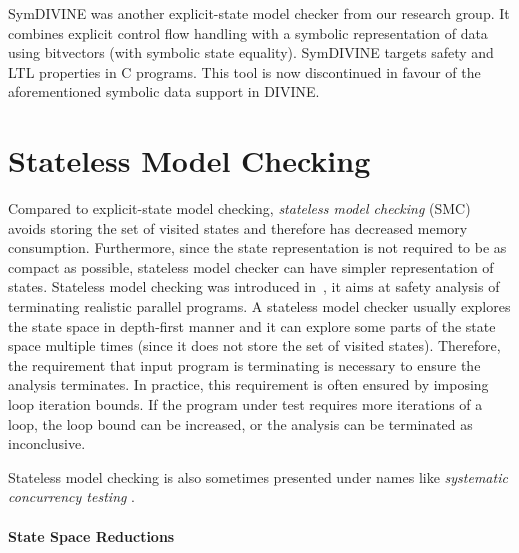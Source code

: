 SymDIVINE  was another explicit-state model checker from our research group.
It combines explicit control flow handling with a symbolic representation of data
using bitvectors (with symbolic state equality).
SymDIVINE targets safety and LTL properties in C programs.
This tool is now discontinued in favour of the aforementioned symbolic data support
in DIVINE.


\section{Stateless Model Checking}\label{sec:stateoftheart:smc}

Compared to explicit-state model checking, \emph{stateless model checking}
(SMC) avoids storing the set of visited states and therefore has decreased
memory consumption.
Furthermore, since the state representation is not required to be as compact as
possible, stateless model checker can have simpler representation of states.
Stateless model checking was introduced in~, it aims at
safety analysis of terminating realistic parallel programs.
A stateless model checker usually explores the state space in depth-first
manner and it can explore some parts of the state space multiple times (since
it does not store the set of visited states).
Therefore, the requirement that input program is terminating is necessary to
ensure the analysis terminates.
In practice, this requirement is often ensured by imposing loop iteration
bounds.
If the program under test requires more iterations of a loop, the loop bound
can be increased, or the analysis can be terminated as inconclusive.

Stateless model checking is also sometimes presented under names like \emph{systematic concurrency testing} .

\paragraph{State Space Reductions}

